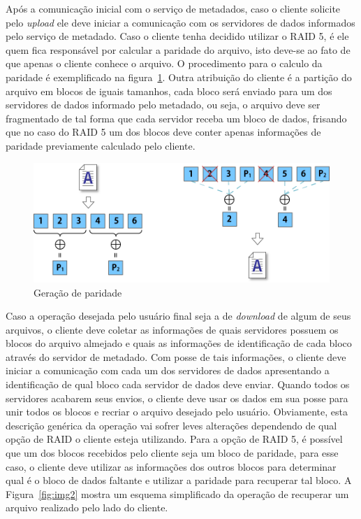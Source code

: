 Após a comunicação inicial com o serviço de metadados, caso o cliente solicite pelo \textit{upload} ele deve iniciar a comunicação com os servidores de dados informados pelo serviço de metadado. Caso o cliente tenha decidido utilizar o RAID 5, é ele quem fica responsável por calcular a paridade do arquivo, isto deve-se ao fato de que apenas o cliente conhece o arquivo. O procedimento para o calculo da paridade é exemplificado na figura~\ref{fig:img6}. Outra atribuição do cliente é a partição do arquivo em blocos de iguais tamanhos, cada bloco será enviado para um dos servidores de dados informado pelo metadado, ou seja, o arquivo deve ser fragmentado de tal forma que cada servidor receba um bloco de dados, frisando que no caso do RAID 5 um dos blocos deve conter apenas informações de paridade previamente calculado pelo cliente. 
\\

\begin{figure}[htb]
	\begin{center}
		
		\includegraphics[clip,width=15.0cm]{images/image6.png}
		\caption{Geração de paridade}
		\label{fig:img6}
	\end{center}
\end{figure}

Caso a operação desejada pelo usuário final seja a de \textit{download} de algum de seus arquivos, o cliente deve coletar as informações de quais servidores possuem os blocos do arquivo almejado e quais as informações de identificação de cada bloco através do servidor de metadado. Com posse de tais informações, o cliente deve iniciar a comunicação com cada um dos servidores de dados apresentando a identificação de qual bloco cada servidor de dados deve enviar. Quando todos os servidores acabarem seus envios, o cliente deve usar os dados em sua posse para unir todos os blocos e recriar o arquivo desejado pelo usuário. Obviamente, esta descrição genérica da operação vai sofrer leves alterações dependendo de qual opção de RAID o cliente esteja utilizando. Para a opção de RAID 5, é possível que um dos blocos recebidos pelo cliente seja um bloco de paridade, para esse caso, o cliente deve utilizar as informações dos outros blocos para determinar qual é o bloco de dados faltante e utilizar a paridade para recuperar tal bloco. A Figura~\ref{fig:img2} mostra um esquema simplificado da operação de recuperar um arquivo realizado pelo lado do cliente.
\\

